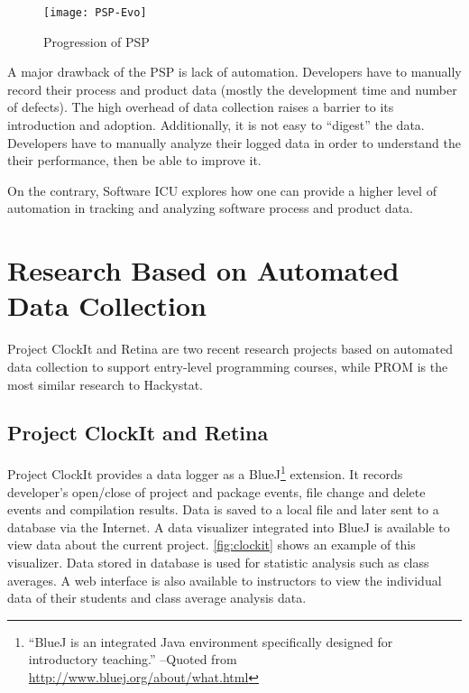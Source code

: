 \begin{figure}[htbp] %
   \centering
   \texttt{[image: PSP-Evo]} 
   \caption{Progression of PSP}
   \label{fig:PSP-Evo}
\end{figure}


A major drawback of the PSP is lack of automation. Developers have to manually record their process and product data (mostly the development time and number of defects). The high overhead of data collection raises a barrier to its introduction and adoption. Additionally, it is not easy to ``digest'' the data. Developers have to manually analyze their logged data in order to understand the their performance, then be able to improve it.

On the contrary, Software ICU explores how one can provide a higher level of automation in tracking and analyzing software process and product data.


\section {Research Based on Automated Data Collection}
Project ClockIt and Retina are two recent research projects based on automated data collection to support entry-level programming courses, while PROM is the most similar research to Hackystat.

\subsection {Project ClockIt and Retina}
Project ClockIt provides a data logger as a BlueJ\footnote{``BlueJ is an integrated Java environment specifically designed for introductory teaching.'' --Quoted from \url{http://www.bluej.org/about/what.html}} extension. It records developer's open/close of project and package events, file change and delete events and compilation results. Data is saved to a local file and later sent to a database via the Internet. A data visualizer integrated into BlueJ is available to view data about the current project. \autoref{fig:clockit} shows an example of this visualizer. Data stored in database is used for statistic analysis such as class averages. A web interface is also available to instructors to view the individual data of their students and class average analysis data.

